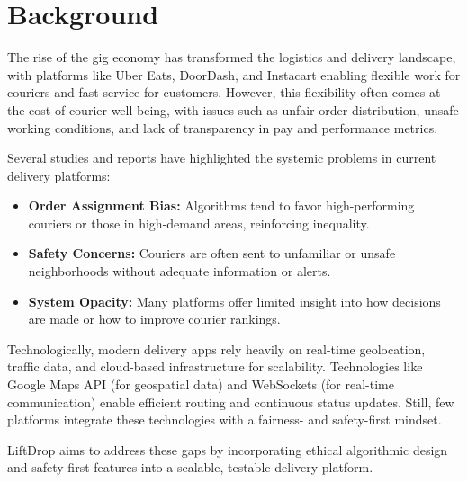 \section{Background}

The rise of the gig economy has transformed the logistics and delivery landscape, with platforms like Uber Eats, DoorDash, and Instacart enabling flexible work for couriers and fast service for customers. However, this flexibility often comes at the cost of courier well-being, with issues such as unfair order distribution, unsafe working conditions, and lack of transparency in pay and performance metrics.

Several studies and reports have highlighted the systemic problems in current delivery platforms:

\begin{itemize}
    \item \textbf{Order Assignment Bias:} Algorithms tend to favor high-performing couriers or those in high-demand areas, reinforcing inequality.
    \item \textbf{Safety Concerns:} Couriers are often sent to unfamiliar or unsafe neighborhoods without adequate information or alerts.
    \item \textbf{System Opacity:} Many platforms offer limited insight into how decisions are made or how to improve courier rankings.
\end{itemize}

Technologically, modern delivery apps rely heavily on real-time geolocation, traffic data, and cloud-based infrastructure for scalability. Technologies like Google Maps API (for geospatial data) and WebSockets (for real-time communication) enable efficient routing and continuous status updates. Still, few platforms integrate these technologies with a fairness- and safety-first mindset.

LiftDrop aims to address these gaps by incorporating ethical algorithmic design and safety-first features into a scalable, testable delivery platform.

